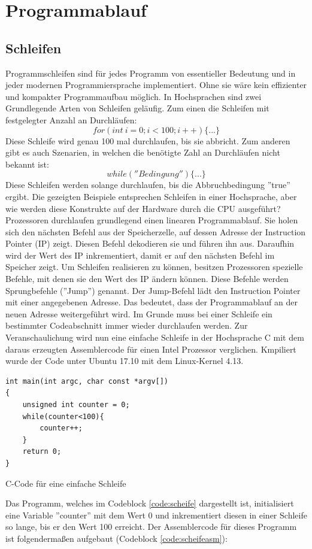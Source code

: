 \documentclass[a4paper,12pt]{article}
\begin{document}

\newpage
\section{Programmablauf}	\label{sec:programmablauf}
\subsection{Schleifen}
Programmschleifen sind für jedes Programm von essentieller Bedeutung und in jeder modernen Programmiersprache implementiert. Ohne sie wäre kein effizienter und kompakter Programmaufbau möglich. In Hochsprachen sind zwei Grundlegende Arten von Schleifen geläufig. Zum einen die Schleifen mit festgelegter Anzahl an Durchläufen: 
$$for(int \ i=0; i<100; i++)\{...\}$$
Diese Schleife wird genau 100 mal durchlaufen, bis sie abbricht. Zum anderen gibt es auch Szenarien, in welchen die benötigte Zahl an Durchläufen nicht bekannt ist:
$$while(''Bedingung'')\{...\}$$
Diese Schleifen werden solange durchlaufen, bis die Abbruchbedingung ''true'' ergibt. Die gezeigten Beispiele entsprechen Schleifen in einer Hochsprache, aber wie werden diese Konstrukte auf der Hardware durch die CPU ausgeführt?
Prozessoren durchlaufen grundlegend einen linearen Programmablauf. Sie holen sich den nächsten Befehl aus der Speicherzelle, auf dessen Adresse der Instruction Pointer (IP) zeigt. Diesen Befehl dekodieren sie und führen ihn aus. Daraufhin wird der Wert des IP inkrementiert, damit er auf den nächsten Befehl im Speicher zeigt. Um Schleifen realisieren zu können, besitzen Prozessoren spezielle Befehle, mit denen sie den Wert des IP ändern können. Diese Befehle werden Sprungbefehle (''Jump'') genannt. Der Jump-Befehl lädt den Instruction Pointer mit einer angegebenen Adresse. Das bedeutet, dass der Programmablauf an der neuen Adresse weitergeführt wird. Im Grunde muss bei einer Schleife ein bestimmter Codeabschnitt immer wieder durchlaufen werden. Zur Veranschaulichung wird nun eine einfache Schleife in der Hochsprache C mit dem daraus erzeugten Assemblercode für einen Intel Prozessor verglichen. Kmpiliert wurde der Code unter Ubuntu 17.10 mit dem Linux-Kernel 4.13.

\begin{code}[!htb]
\begin{lstlisting}
int main(int argc, char const *argv[])
{
	unsigned int counter = 0;
	while(counter<100){
		counter++;
	}
	return 0;
}
\end{lstlisting}
\caption[C Code einfache Schleife]{C-Code für eine einfache Schleife}
\label{code:scheife}
\end{code}
\newpage
\par\bigskip\noindent Das Programm, welches im Codeblock \ref{code:scheife} dargestellt ist, initialisiert eine Variable ''counter'' mit dem Wert 0 und inkrementiert diesen in einer Schleife so lange, bis er den Wert 100 erreicht. Der Assemblercode für dieses Programm ist folgendermaßen aufgebaut (Codeblock \ref{code:scheifeasm}):
\end{document}
